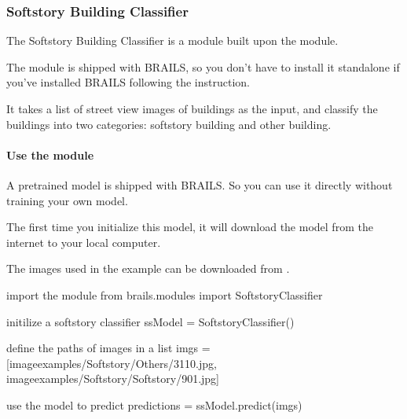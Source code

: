 \documentclass[letterpaper,10pt,english]{sphinxmanual}
\begin{document}
\subsubsection{Soft\sphinxhyphen{}story Building Classifier}
\label{\detokenize{common/user_manual/modules/softstoryClassifier:soft-story-building-classifier}}\label{\detokenize{common/user_manual/modules/softstoryClassifier:lbl-softstoryclassifier}}\label{\detokenize{common/user_manual/modules/softstoryClassifier::doc}}
\sphinxAtStartPar
The Soft\sphinxhyphen{}story Building Classifier is a module built upon the {\hyperref[\detokenize{common/user_manual/modules/genericImageClassifier:lbl-genericimageclassifier}]{}} module.

\sphinxAtStartPar
The module is shipped with BRAILS,
so you don’t have to install it standalone if you’ve installed BRAILS following the {\hyperref[\detokenize{common/user_manual/installation:lbl-install}]{}} instruction.

\sphinxAtStartPar
It takes a list of street view images of buildings as the input, and classify the buildings into two categories: soft\sphinxhyphen{}story building and  other building.


\paragraph{Use the module}
\label{\detokenize{common/user_manual/modules/softstoryClassifier:use-the-module}}
\sphinxAtStartPar
A pretrained model is shipped with BRAILS. So you can use it directly without training your own model.

\sphinxAtStartPar
The first time you initialize this model, it will download the model from the internet to your local computer.

\sphinxAtStartPar
The images used in the example can be downloaded from .

\begin{sphinxVerbatim}[commandchars=\\\{\}]
\PYGZsh{} import the module
from brails.modules import SoftstoryClassifier

\PYGZsh{} initilize a soft\PYGZhy{}story classifier
ssModel = SoftstoryClassifier()

\PYGZsh{} define the paths of images in a list
imgs = [\PYGZsq{}image\PYGZus{}examples/Softstory/Others/3110.jpg\PYGZsq{},
        \PYGZsq{}image\PYGZus{}examples/Softstory/Softstory/901.jpg\PYGZsq{}]

\PYGZsh{} use the model to predict
predictions = ssModel.predict(imgs)
\end{sphinxVerbatim}
\end{document}
